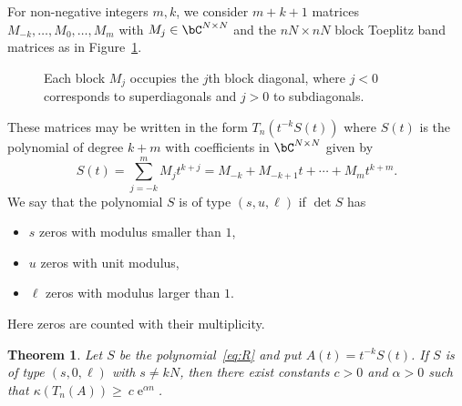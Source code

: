 \documentclass[addpoints,12pt,letter]{article}
\DeclareMathOperator{\e}{e}
\DeclareMathOperator{\mi}{i} %
\newcommand{\al}{\alpha}
\newcommand{\ka}{\kappa}
\newcommand{\SR}{S}
\renewcommand{\ge}{\geqslant}
\numberwithin{equation}{section}
\newtheorem{theorem}[lemma]{Theorem}
\theoremstyle{definition}
\begin{document}
For non-negative integers $m,k$, we consider $m+k+1$ matrices $M_{-k},\ldots, M_{0},\ldots, M_{m}$ with $M_{j}\in\bC^{N\times N}$ and the $nN \times nN$ block Toeplitz band matrices as in Figure~\ref{fg:3}.
\begin{figure}[h]
\centering
{}

\caption{Each block $M_{j}$ occupies the $j$th block diagonal, where $j<0$ corresponds to superdiagonals and $j>0$ to subdiagonals.}\label{fg:3}
\end{figure}

These matrices may be written in the form $T_{n}(t^{-k}\SR(t))$ where $\SR(t)$ is the polynomial of degree $k+m$ with coefficients in $\bC^{N\times N}$ given by
\begin{equation}\label{eq:R}
\SR(t)=\sum_{j=-k}^{m} M_{j} t^{k+j}=M_{-k}+M_{-k+1}t+\cdots+M_{m}t^{k+m}.
\end{equation}
We say that the polynomial $\SR$ is of type $(s,u,\ell)$ if $\det \SR$ has
\begin{itemize}
\item $s$ zeros with modulus smaller than $1$,
\item $u$ zeros with unit modulus,
\item $\ell$ zeros with modulus larger than $1$.
\end{itemize}
Here zeros are counted with their multiplicity.

\begin{theorem}\label{cr:R}
Let $\SR$ be the polynomial~\eqref{eq:R} and put $A(t)=t^{-k}\SR(t)$.
If $\SR$ is of type $(s,0,\ell)$ with $s\ne kN$, then there exist constants $c>0$ and $\al>0$ such that $\ka(T_{n}(A))\ge~c\e^{\al n}$.
\end{theorem}
\end{document}
